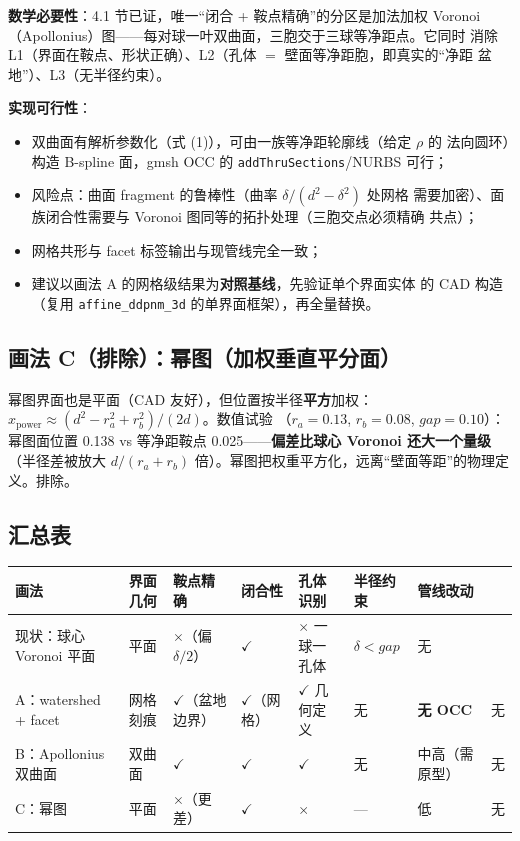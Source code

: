 \documentclass[11pt]{ctexart}
\begin{document}
\textbf{数学必要性}：4.1 节已证，唯一``闭合 + 鞍点精确''的分区是加法加权
Voronoi（Apollonius）图——每对球一叶双曲面，三胞交于三球等净距点。它同时
消除 L1（界面在鞍点、形状正确）、L2（孔体 $=$ 壁面等净距胞，即真实的``净距
盆地''）、L3（无半径约束）。

\textbf{实现可行性}：
\begin{itemize}
  \item 双曲面有解析参数化（式 (1)），可由一族等净距轮廓线（给定 $\rho$ 的
  法向圆环）构造 B-spline 面，gmsh OCC 的 \texttt{addThruSections}/NURBS
  可行；
  \item 风险点：曲面 fragment 的鲁棒性（曲率 $\delta/(d^2-\delta^2)$ 处网格
  需要加密）、面族闭合性需要与 Voronoi 图同等的拓扑处理（三胞交点必须精确
  共点）；
  \item 网格共形与 facet 标签输出与现管线完全一致；
  \item 建议以画法 A 的网格级结果为\textbf{对照基线}，先验证单个界面实体
  的 CAD 构造（复用 \texttt{affine\_ddpnm\_3d} 的单界面框架），再全量替换。
\end{itemize}

\subsection{画法 C（排除）：幂图（加权垂直平分面）}

幂图界面也是平面（CAD 友好），但位置按半径\textbf{平方}加权：
$x_{\mathrm{power}} \approx (d^2 - r_a^2 + r_b^2)/(2d)$。数值试验
（$r_a=0.13$, $r_b=0.08$, $gap=0.10$）：幂图面位置 0.138 vs 等净距鞍点
0.025——\textbf{偏差比球心 Voronoi 还大一个量级}（半径差被放大
$d/(r_a+r_b)$ 倍）。幂图把权重平方化，远离``壁面等距''的物理定义。排除。

\subsection{汇总表}

\begin{center}
\small
\begin{tabular}{p{2.6cm}p{1.7cm}p{1.7cm}p{1.9cm}p{1.9cm}p{1.5cm}p{1.5cm}}
\toprule
画法 & 界面几何 & 鞍点精确 & 闭合性 & 孔体识别 & 半径约束 & 管线改动 \\
\midrule
现状：球心 Voronoi 平面 & 平面 & $\times$（偏 $\delta/2$） & $\checkmark$ &
$\times$ 一球一孔体 & $\delta < gap$ & 无 \\
A：watershed + facet & 网格刻痕 & $\checkmark$（盆地边界） &
$\checkmark$（网格） & $\checkmark$ 几何定义 & 无 & \textbf{无 OCC} & 无 \\
B：Apollonius 双曲面 & 双曲面 & $\checkmark$ & $\checkmark$ & $\checkmark$ &
无 & 中高（需原型） & 无 \\
C：幂图 & 平面 & $\times$（更差） & $\checkmark$ & $\times$ & — & 低 & 无 \\
\bottomrule
\end{tabular}
\end{center}
\end{document}
